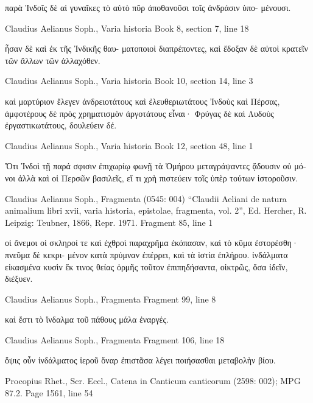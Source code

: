 \documentclass[12pt,letterpaper,twoside,final]{memoir}
\begin{document}
\begin{greek}
                                       παρὰ Ἰνδοῖς δὲ αἱ 
γυναῖκες τὸ αὐτὸ πῦρ ἀποθανοῦσι τοῖς ἀνδράσιν ὑπο-
μένουσι. 



Claudius Aelianus Soph., Varia historia 
Book 8, section 7, line 18

                      ἦσαν δὲ καὶ ἐκ τῆς Ἰνδικῆς θαυ-
ματοποιοὶ διαπρέποντες, καὶ ἔδοξαν δὲ αὐτοὶ κρατεῖν 
τῶν ἄλλων τῶν ἀλλαχόθεν. 



Claudius Aelianus Soph., Varia historia 
Book 10, section 14, line 3

                καὶ μαρτύριον ἔλεγεν ἀνδρειοτάτους καὶ 
ἐλευθεριωτάτους Ἰνδοὺς καὶ Πέρσας, ἀμφοτέρους δὲ 
πρὸς χρηματισμὸν ἀργοτάτους εἶναι· Φρύγας δὲ καὶ 
Λυδοὺς ἐργαστικωτάτους, δουλεύειν δέ. 



Claudius Aelianus Soph., Varia historia 
Book 12, section 48, line 1

Ὅτι Ἰνδοὶ τῇ παρά σφισιν ἐπιχωρίῳ φωνῇ τὰ 
Ὁμήρου μεταγράψαντες ᾄδουσιν οὐ μόνοι ἀλλὰ καὶ 
οἱ Περσῶν βασιλεῖς, εἴ τι χρὴ πιστεύειν τοῖς ὑπὲρ 
τούτων ἱστοροῦσιν. 



Claudius Aelianus Soph., Fragmenta (0545: 004)
“Claudii Aeliani de natura animalium libri xvii, varia historia, epistolae, fragmenta, vol. 2”, Ed. Hercher, R.
Leipzig: Teubner, 1866, Repr. 1971.
Fragment 85, line 1

οἱ ἄνεμοι οἱ σκληροί τε καὶ ἐχθροὶ παραχρῆμα 
ἐκόπασαν, καὶ τὸ κῦμα ἐστορέσθη· πνεῦμα δὲ κεκρι-
μένον κατὰ πρύμναν ἐπέρρει, καὶ τὰ ἱστία ἐπλήρου. 
 ἰνδάλματα εἰκασμένα κυσὶν ἔκ τινος θείας ὁρμῆς 
τοῦτον ἐπιπηδήσαντα, οἰκτρῶς, ὅσα ἰδεῖν, διέξυεν. 



Claudius Aelianus Soph., Fragmenta 
Fragment 99, line 8

                                                          καὶ 
ἔστι τὸ ἴνδαλμα τοῦ πάθους μάλα ἐναργές. 



Claudius Aelianus Soph., Fragmenta 
Fragment 106, line 18

ὄψις οὖν ἰνδάλματος ἱεροῦ ὄναρ ἐπιστᾶσα λέγει 
ποιήσασθαι μεταβολὴν βίου. 



Procopius Rhet., Scr. Eccl., Catena in Canticum canticorum (2598: 002); MPG 87.2.
Page 1561, line 54



\end{greek}
\end{document}
